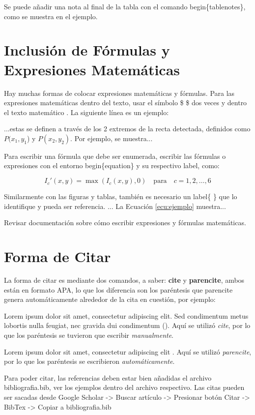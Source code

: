 Se puede añadir una nota al final de la tabla con el comando begin\{tablenotes\}, como se muestra en el ejemplo.



\section{Inclusión de Fórmulas y Expresiones Matemáticas}

Hay muchas formas de colocar expresiones matemáticas y fórmulas. Para las expresiones matemáticas dentro del texto, usar el símbolo \$ \$ dos veces y dentro el texto matemático . La siguiente línea es un ejemplo:

...estas se definen a través de los 2 extremos de la recta detectada, definidos como $P(x_1, y_1$) y $P(x_2, y_2)$. Por ejemplo, se muestra...

Para escribir una fórmula que debe ser enumerada, escribir las fórmulas o expresiones con el entorno begin\{equation\} y su respectivo label, como:

\begin{equation}
	I_{c}'(x, y) = \max(I_{c}(x, y), 0) \quad \text{para} \quad c = 1, 2, \dots, 6
	\label{ecu:ejemplo}
\end{equation}

Similarmente con las figuras y tablas, también es necesario un label\{ \} que lo identifique y pueda ser referencia. ... La Ecuación \ref{ecu:ejemplo} muestra...

Revisar documentación sobre cómo escribir expresiones y fórmulas matemáticas.

\section{Forma de Citar}

La forma de citar es mediante dos comandos, a saber: \textbf{cite} y \textbf{parencite}, ambos están en formato APA, lo que los diferencia son los paréntesis que parencite genera automáticamente alrededor de la cita en cuestión, por ejemplo:

Lorem ipsum dolor sit amet, consectetur adipiscing elit. Sed condimentum metus lobortis nulla feugiat, nec gravida dui condimentum (\cite{wood2021contemporary}). Aquí se utilizó \textit{cite}, por lo que los paréntesis se tuvieron que escribir \textit{manualmente}.

Lorem ipsum dolor sit amet, consectetur adipiscing elit \parencite{wood2021contemporary}. Aquí se utilizó \textit{parencite}, por lo que los paréntesis se escribieron \textit{automáticamente}.

Para poder citar, las referencias deben estar bien añadidas el archivo bibliografia.bib, ver los ejemplos dentro del archivo respectivo. Las citas pueden ser sacadas desde Google Scholar -> Buscar artículo -> Presionar botón Citar -> BibTex -> Copiar a bibliografia.bib


